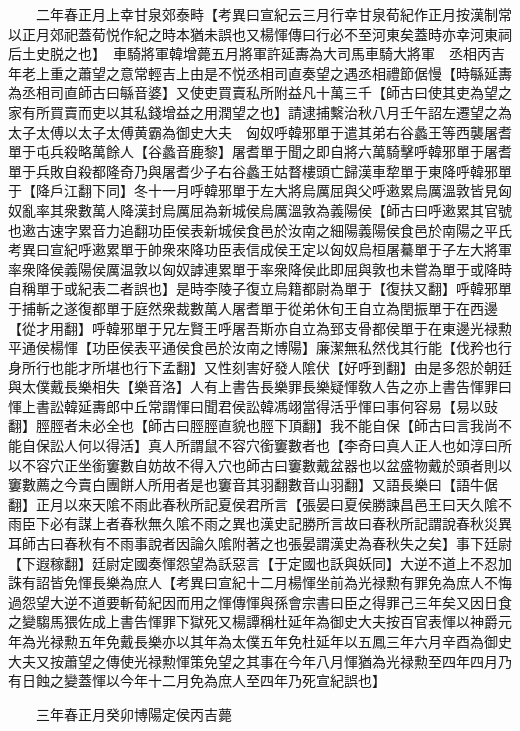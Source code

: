 　　二年春正月上幸甘泉郊泰畤【考異曰宣紀云三月行幸甘泉荀紀作正月按漢制常以正月郊祀蓋荀悦作紀之時本猶未誤也又楊惲傳曰行必不至河東矣蓋時亦幸河東祠后土史脱之也】　車騎將軍韓增薨五月將軍許延夀為大司馬車騎大將軍　丞相丙吉年老上重之蕭望之意常輕吉上由是不悦丞相司直奏望之遇丞相禮節倨慢【時緐延夀為丞相司直師古曰緐音婆】又使吏買賣私所附益凡十萬三千【師古曰使其吏為望之家有所買賣而吏以其私錢增益之用潤望之也】請逮捕繫治秋八月壬午詔左遷望之為太子太傅以太子太傅黄霸為御史大夫　匈奴呼韓邪單于遣其弟右谷蠡王等西襲屠耆單于屯兵殺略萬餘人【谷蠡音鹿黎】屠耆單于聞之即自將六萬騎擊呼韓邪單于屠耆單于兵敗自殺都隆奇乃與屠耆少子右谷蠡王姑瞀樓頭亡歸漢車犂單于東降呼韓邪單于【降戶江翻下同】冬十一月呼韓邪單于左大將烏厲屈與父呼遫累烏厲溫敦皆見匈奴亂率其衆數萬人降漢封烏厲屈為新城侯烏厲溫敦為義陽侯【師古曰呼遫累其官號也遫古速字累音力追翻功臣侯表新城侯食邑於汝南之細陽義陽侯食邑於南陽之平氏　考異曰宣紀呼遫累單于帥衆來降功臣表信成侯王定以匈奴烏桓屠驀單于子左大將軍率衆降侯義陽侯厲温敦以匈奴謼連累單于率衆降侯此即屈與敦也未嘗為單于或降時自稱單于或紀表二者誤也】是時李陵子復立烏籍都尉為單于【復扶又翻】呼韓邪單于捕斬之遂復都單于庭然衆裁數萬人屠耆單于從弟休旬王自立為閏振單于在西邊【從才用翻】呼韓邪單于兄左賢王呼屠吾斯亦自立為郅支骨都侯單于在東邊光禄勲平通侯楊惲【功臣侯表平通侯食邑於汝南之博陽】廉潔無私然伐其行能【伐矜也行身所行也能才所堪也行下孟翻】又性刻害好發人隂伏【好呼到翻】由是多怨於朝廷與太僕戴長樂相失【樂音洛】人有上書告長樂罪長樂疑惲敎人告之亦上書告惲罪曰惲上書訟韓延夀郎中丘常謂惲曰聞君侯訟韓馮翊當得活乎惲曰事何容易【易以䜴翻】脛脛者未必全也【師古曰脛脛直貌也脛下頂翻】我不能自保【師古曰言我尚不能自保訟人何以得活】真人所謂鼠不容穴銜窶數者也【李奇曰真人正人也如淳曰所以不容穴正坐銜窶數自妨故不得入穴也師古曰窶數戴盆器也以盆盛物戴於頭者則以窶數薦之今賣白團餅人所用者是也窶音其羽翻數音山羽翻】又語長樂曰【語牛倨翻】正月以來天隂不雨此春秋所記夏侯君所言【張晏曰夏侯勝諫昌邑王曰天久隂不雨臣下必有謀上者春秋無久隂不雨之異也漢史記勝所言故曰春秋所記謂說春秋災異耳師古曰春秋有不雨事說者因論久隂附著之也張晏謂漢史為春秋失之矣】事下廷尉【下遐稼翻】廷尉定國奏惲怨望為訞惡言【于定國也訞與妖同】大逆不道上不忍加誅有詔皆免惲長樂為庶人【考異曰宣紀十二月楊惲坐前為光禄勲有罪免為庶人不悔過怨望大逆不道要斬荀紀因而用之惲傳惲與孫會宗書曰臣之得罪己三年矣又因日食之變騶馬猥佐成上書告惲罪下獄死又楊譚稱杜延年為御史大夫按百官表惲以神爵元年為光禄勲五年免戴長樂亦以其年為太僕五年免杜延年以五鳳三年六月辛酉為御史大夫又按蕭望之傳使光禄勲惲策免望之其事在今年八月惲猶為光禄勲至四年四月乃有日蝕之變蓋惲以今年十二月免為庶人至四年乃死宣紀誤也】

　　三年春正月癸卯博陽定侯丙吉薨

